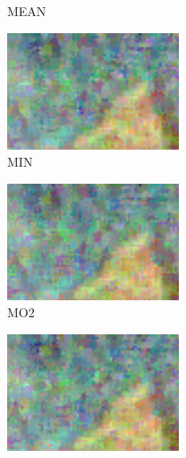 \begin{figure}
{\begin{subfigure}[b]{0.25\textwidth}
			\caption{MEAN}
			\label{fig:mean}
		\end{subfigure}
		\begin{subfigure}[b]{0.25\textwidth}
			\centering
			\includegraphics[width=0.95\linewidth]{fig/MINM5}
			\caption{MIN}
			\label{fig:min}
		\end{subfigure}
		\begin{subfigure}[b]{0.25\textwidth}
			\centering
			\includegraphics[width=0.95\linewidth]{fig/MOD2M5}
			\caption{MO2}
			\label{fig:mo2}
		\end{subfigure}
		\begin{subfigure}[b]{0.25\textwidth}
			\centering
			\includegraphics[width=0.95\linewidth]{fig/MODM5}

\end{subfigure}}
\end{figure}
